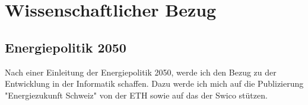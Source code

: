 \chapter{Wissenschaftlicher Bezug}

\section{Energiepolitik 2050}

Nach einer Einleitung der Energiepolitik 2050, werde ich den Bezug zu der Entwicklung in der
Informatik schaffen. Dazu werde ich mich auf die Publizierung
"Energiezukunft Schweiz"\cite{eth_energiezukunft_schweiz} von der ETH sowie auf das\cite{swico_datenblatt}
der Swico stützen.

\section{}


